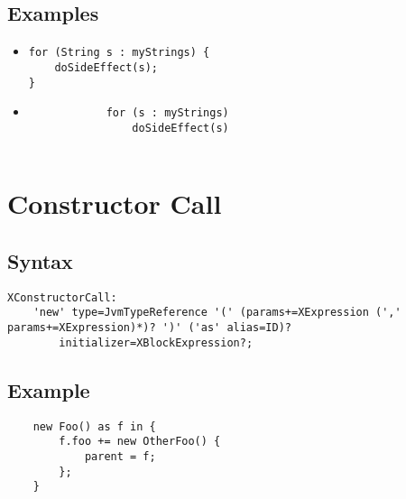 \documentclass[a4paper,10pt]{scrreprt}
\newlength{\itemindentlen}
\begin{document}
\subsection{Examples}

\setlength{\itemindentlen}{\textwidth}
\begin{itemize}
\addtolength{\itemindentlen}{-2em}

\item \begin{minipage}[t]{\itemindentlen}
\begin{lstlisting}
for (String s : myStrings) {
	doSideEffect(s);
}
\end{lstlisting}

\end{minipage}

\item \begin{minipage}[t]{\itemindentlen}

		\begin{lstlisting}
			for (s : myStrings)
				doSideEffect(s)
		
\end{lstlisting}

	
\end{minipage}

\end{itemize}
\addtolength{\itemindentlen}{2em}







\section{Constructor Call\label{ConstructorCall}}


\subsection{Syntax}
\begin{lstlisting}
XConstructorCall:
	'new' type=JvmTypeReference '(' (params+=XExpression (',' params+=XExpression)*)? ')' ('as' alias=ID)?
		initializer=XBlockExpression?;

\end{lstlisting}





\subsection{Example}
\begin{lstlisting}
	new Foo() as f in {
		f.foo += new OtherFoo() {
			parent = f;
		};
	}

\end{lstlisting}
\end{document}
